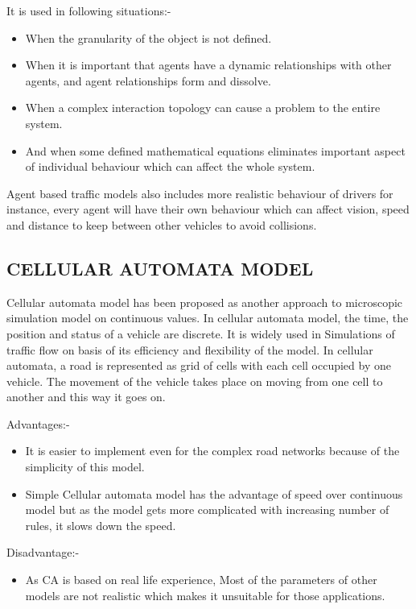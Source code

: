 \documentclass[11pt,a4paper]{article}
\begin{document}
	It is used in following situations:-
	\begin{itemize}
		\setlength\itemsep{0.1em}
		\item When the granularity of the object is not defined.
		\item When it is important that agents have a dynamic relationships with other agents, and agent relationships form and dissolve.\cite{Macal06}
		\item When a complex interaction topology can cause a problem to the entire system.
		\item And when some defined mathematical equations eliminates important aspect of individual behaviour which can affect the whole system.\cite{Ljubović09}
	\end{itemize}
	Agent based traffic models also includes more realistic behaviour
	of drivers for instance, every agent will have their own
	behaviour which can affect vision, speed and distance to keep
	between other vehicles to avoid collisions.
			
	\subsection{CELLULAR AUTOMATA MODEL}
	Cellular automata model has been proposed as another approach to microscopic simulation model on continuous values. In cellular automata model, the time, the position and status of a vehicle are discrete. It is widely used in Simulations of traffic flow on basis of its efficiency and flexibility of the model. In cellular automata, a road is represented as grid of cells with each cell occupied by one vehicle. The movement of the vehicle takes place on moving from one cell to another and this way it goes on. \cite{Ljubović09}
	
	Advantages:-
	\begin{itemize}
		\setlength\itemsep{0.1em}
		\item It is easier to implement even for the complex road networks because of the simplicity of this model.
		\item Simple Cellular automata model has the advantage of speed over continuous model but as the model gets more complicated with increasing number of rules, it slows down the speed.
	\end{itemize}
	
	Disadvantage:-
	\begin{itemize}
		\setlength\itemsep{0.1em}
		\item As CA is based on real life experience, Most of the parameters of other models are not realistic which makes it unsuitable for those applications. \cite{treiber13}
	\end{itemize}
\end{document}
